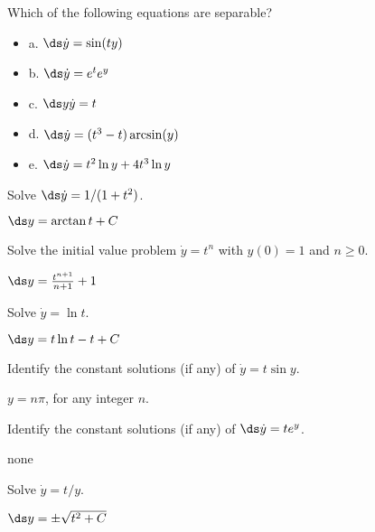 \begin{exercises}

\begin{exercise} Which of the following equations are separable?

\begin{itemize} %
\item{a.} $\ds \dot{y} = \sin (ty)$
\item{b.} $\ds \dot{y} = e^t e^y $
\item{c.} $\ds y\dot{y} = t $
\item{d.} $\ds \dot{y} = (t^3 -t) \arcsin(y)$
\item{e.} $\ds \dot{y} = t^2 \ln y + 4t^3 \ln y $

\end{itemize}

\begin{exercise} Solve $\ds\dot{y} = 1/(1+t^2)$.
\begin{answer} $\ds y=\arctan t + C$
\end{answer}\end{exercise}

\begin{exercise} Solve the initial value problem $\dot{y} = t^n$ with
$y(0)=1$ and $n\ge 0$.
\begin{answer} $\ds y={t^{n+1}\over n+1}+1$
\end{answer}\end{exercise}

\begin{exercise} Solve $\dot{y} = \ln t$. 
\begin{answer} $\ds y=t\ln t-t+C$
\end{answer}\end{exercise}

\begin{exercise} Identify the constant solutions (if any) of $\dot{y} =t\sin y$.
\begin{answer} $y=n\pi$, for any integer $n$.
\end{answer}\end{exercise}

\begin{exercise} Identify the constant solutions (if any) of $\ds\dot{y}=te^y$.
\begin{answer} none
\end{answer}\end{exercise}

\begin{exercise} Solve $\dot{y} = t/y$.
\begin{answer} $\ds y=\pm\sqrt{t^2+C}$
\end{answer}\end{exercise}


\end{exercise}
\end{exercises}
